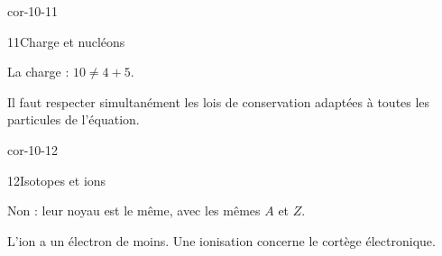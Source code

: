 \begin{blocLivre}{cor-10-11}\begin{corrige}{11}{Charge et nucléons}
\begin{questions}
\item La charge : $10\neq4+5$.
\item Il faut respecter simultanément les lois de conservation adaptées à toutes les particules de l’équation.
\end{questions}
\end{corrige}\end{blocLivre}
\begin{blocLivre}{cor-10-12}\begin{corrige}{12}{Isotopes et ions}
\begin{questions}
\item Non : leur noyau est le même, avec les mêmes $A$ et $Z$.
\item L’ion a un électron de moins. Une ionisation concerne le cortège électronique.
\end{questions}
\end{corrige}\end{blocLivre}

